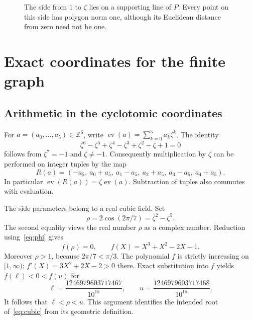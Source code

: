 \documentclass[11pt,a4paper]{article}
\theoremstyle{remark}
\newcommand{\Z}{\mathbb Z}
\newcommand{\ev}{\operatorname{ev}}
\begin{document}
\begin{figure}[ht]
\centering
{}
\caption{The side from $1$ to $\zeta$ lies on a supporting line of $P$.
Every point on this side has polygon norm one, although its Euclidean
distance from zero need not be one.}
\label{fig:side}
\end{figure}

\section{Exact coordinates for the finite graph}\label{sec:graph}

\subsection{Arithmetic in the cyclotomic coordinates}

For $a=(a_0,\ldots,a_5)\in\Z^6$, write
$\ev(a)=\sum_{k=0}^5a_k\zeta^k$. The identity
\begin{equation}\label{eq:phi}
 \zeta^6-\zeta^5+\zeta^4-\zeta^3+\zeta^2-\zeta+1=0
\end{equation}
follows from $\zeta^7=-1$ and $\zeta\neq-1$.
Consequently multiplication by $\zeta$ can be performed on integer tuples
by the map
\begin{equation}\label{eq:rotate}
 R(a)=(-a_5,\ a_0+a_5,\ a_1-a_5,\ a_2+a_5,\ a_3-a_5,\ a_4+a_5).
\end{equation}
In particular $\ev(R(a))=\zeta\ev(a)$. Subtraction of tuples also
commutes with evaluation.

The side parameters belong to a real cubic field. Set
\[
 \rho=2\cos(2\pi/7)=\zeta^2-\zeta^5.
\]
The second equality views the real number $\rho$ as a complex number.
Reduction using~\eqref{eq:phi} gives
\begin{equation}\label{eq:cubic}
 f(\rho)=0,\qquad f(X)=X^3+X^2-2X-1.
\end{equation}
Moreover $\rho>1$, because $2\pi/7<\pi/3$.
The polynomial $f$ is strictly increasing on $[1,\infty)$:
$f'(X)=3X^2+2X-2>0$ there.
Exact substitution into $f$ yields $f(\ell)<0<f(u)$ for
\begin{equation}\label{eq:interval}
 \ell=\frac{1246979603717467}{10^{15}},\qquad
 u=\frac{1246979603717468}{10^{15}}.
\end{equation}
It follows that $\ell<\rho<u$. This argument identifies the intended
root of~\eqref{eq:cubic} from its geometric definition.
\end{document}
